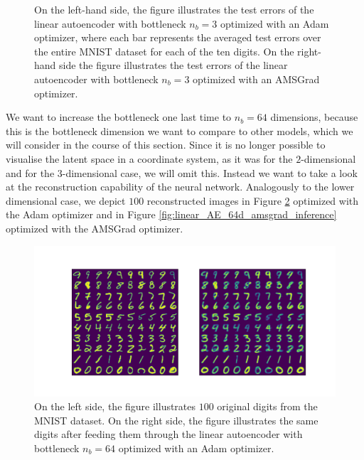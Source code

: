 \begin{figure}
\begin{center}
\begin{minipage}[b]{0.49\linewidth}
	\end{minipage}
\end{center}
\caption{On the left-hand side, the figure illustrates the test errors of the linear autoencoder with bottleneck $n_b=3$ optimized with an Adam optimizer, where each bar represents the averaged test errors over the entire MNIST dataset for each of the ten digits. On the right-hand side the figure illustrates the test errors of the linear autoencoder with bottleneck $n_b=3$ optimized with an AMSGrad optimizer.}\label{fig:linear_AE_3d_errors}
\end{figure}


We want to increase the bottleneck one last time to $n_b=64$ dimensions, because this is the bottleneck dimension we want to compare to other models, which we will consider in the course of this section. Since it is no longer possible to visualise the latent space in a coordinate system, as it was for the $2$-dimensional and for the $3$-dimensional case, we will omit this. Instead we want to take a look at the reconstruction capability of the neural network. Analogously to the lower dimensional case, we depict $100$ reconstructed images in Figure \ref{fig:linear_AE_64d_adam_inference} optimized with the Adam optimizer and in Figure \ref{fig:linear_AE_64d_amsgrad_inference} optimized with the AMSGrad optimizer.

\begin{figure}
\begin{center}
   \begin{minipage}[b]{\linewidth}
      \includegraphics[trim = 15mm 10mm 15mm 15mm, clip, width=\linewidth]{linear_AE_64d_adam_inference}
	\end{minipage}
\end{center}
\caption{On the left side, the figure illustrates $100$ original digits from the MNIST dataset. On the right side, the figure illustrates the same digits after feeding them through the linear autoencoder with bottleneck $n_b=64$ optimized with an Adam optimizer.}\label{fig:linear_AE_64d_adam_inference}
\end{figure}


